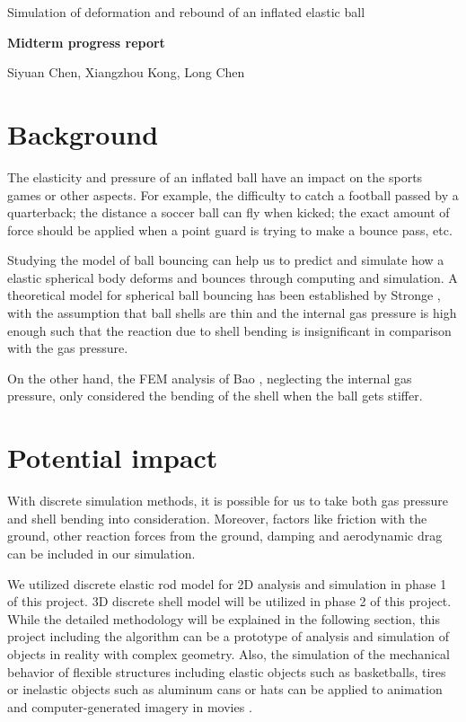 \documentclass[letterpaper,9pt]{article}
\begin{document}
\begin{center}
	\Large
	Simulation of deformation and rebound of an inflated elastic ball 
	 
	{\bf Midterm progress report}
	
	\vspace{1em}
	\large
	Siyuan Chen, Xiangzhou Kong, Long Chen
\end{center}
\vspace{1em}
\begin{multicols}{2}
	\section{Background}
		The elasticity and pressure of an inflated ball have an impact on the sports games or other aspects. For example, the difficulty to catch a football passed by a quarterback; the distance a soccer ball can fly when kicked; the exact amount of force should be applied when a point guard is trying to make a bounce pass, etc. 
		
		Studying the model of ball bouncing can help us to predict and simulate how a elastic spherical body deforms and bounces through computing and simulation. A theoretical model for spherical ball bouncing has been established by Stronge \cite{Stronge06}, with the assumption that ball shells are thin and the internal gas pressure is high enough such that the reaction due to shell bending is insignificant in comparison with the gas pressure. 
		
		On the other hand, the FEM analysis of Bao \cite{Bao15}, neglecting the internal gas pressure, only considered the bending of the shell when the ball gets stiffer. 
	\section{Potential impact}
		With discrete simulation methods, it is possible for us to take both gas pressure and shell bending into consideration. Moreover, factors like friction with the ground, other reaction forces from the ground, damping and aerodynamic drag can be included in our simulation. 
	
	    We utilized discrete elastic rod model for 2D analysis and simulation in phase 1 of this project. 3D discrete shell model will be utilized in phase 2 of this project. While the detailed methodology will be explained in the following section, this project including the algorithm can be a prototype of analysis and simulation of objects in reality with complex geometry. Also, the simulation of the mechanical behavior of flexible structures including elastic objects such as basketballs, tires or inelastic objects such as aluminum cans or hats can be applied to animation and computer-generated imagery in movies \cite{Grinspun08}.

\end{multicols}
\end{document}
